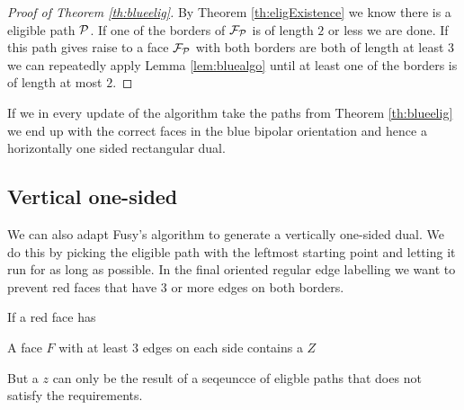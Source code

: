 \begin{proof}[Proof of Theorem \ref{th:blueelig}]
By Theorem \ref{th:eligExistence} we know there is a eligible path $\P$. If one of the borders of $\F_\P$ is of length $2$ or less we are done. If this path gives raise to a face $\F_\P$ with both borders are both of length at least $3$ we can repeatedly apply Lemma \ref{lem:bluealgo} until at least one of the borders is of length at most $2$. 
\end{proof}

If we in every update of the algorithm take the paths from Theorem  \ref{th:blueelig} we end up with the correct faces in the blue bipolar orientation and hence a horizontally one sided rectangular dual.

\subsection{Vertical one-sided}
\label{ss:red}

We can also adapt Fusy's algorithm to generate a vertically one-sided dual. We do this by picking the eligible path with the leftmost starting point and letting it run for as long as possible. In the final oriented regular edge labelling we want to prevent red faces that have $3$ or more edges on both borders. 

If a red face has 
\begin{lemma}
A face $F$ with at least $3$ edges on each side contains a $Z$ 
\end{lemma}

But a $z$ can only be the result of a seqeuncce of eligble paths that does not satisfy the requirements. 

